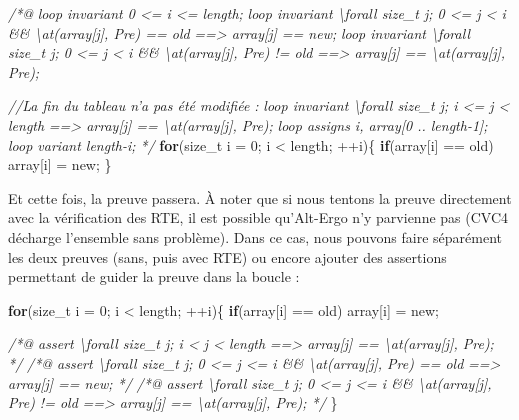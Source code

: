 \documentclass[12pt,francais,]{scrbook}
\newenvironment{Shaded}{}{}
\newcommand{\KeywordTok}[1]{\textcolor[rgb]{0.00,0.44,0.13}{\textbf{{#1}}}}
\newcommand{\DecValTok}[1]{\textcolor[rgb]{0.25,0.63,0.44}{{#1}}}
\newcommand{\CommentTok}[1]{\textcolor[rgb]{0.38,0.63,0.69}{\textit{{#1}}}}
\newcommand{\NormalTok}[1]{{#1}}
\begin{document}
\begin{footnotesize}\begin{Shaded}
\begin{Highlighting}[]
\CommentTok{/*@}
\CommentTok{  loop invariant 0 <= i <= length;}
\CommentTok{  loop invariant \textbackslash{}forall size_t j; 0 <= j < i && \textbackslash{}at(array[j], Pre) == old }
\CommentTok{                   ==> array[j] == new;}
\CommentTok{  loop invariant \textbackslash{}forall size_t j; 0 <= j < i && \textbackslash{}at(array[j], Pre) != old }
\CommentTok{                   ==> array[j] == \textbackslash{}at(array[j], Pre);}

\CommentTok{  //La fin du tableau n'a pas été modifiée :}
\CommentTok{  loop invariant \textbackslash{}forall size_t j; i <= j < length}
\CommentTok{                     ==> array[j] == \textbackslash{}at(array[j], Pre);}
\CommentTok{  loop assigns i, array[0 .. length-1];}
\CommentTok{  loop variant length-i;}
\CommentTok{*/}
\KeywordTok{for}\NormalTok{(size_t i = }\DecValTok{0}\NormalTok{; i < length; ++i)\{}
  \KeywordTok{if}\NormalTok{(array[i] == old) array[i] = new;}
\NormalTok{\}}
\end{Highlighting}
\end{Shaded}\end{footnotesize}

Et cette fois, la preuve passera. À noter que si nous tentons la preuve
directement avec la vérification des RTE, il est possible qu'Alt-Ergo
n'y parvienne pas (CVC4 décharge l'ensemble sans problème). Dans ce cas,
nous pouvons faire séparément les deux preuves (sans, puis avec RTE) ou
encore ajouter des assertions permettant de guider la preuve dans la
boucle :

\begin{footnotesize}\begin{Shaded}
\begin{Highlighting}[]
\KeywordTok{for}\NormalTok{(size_t i = }\DecValTok{0}\NormalTok{; i < length; ++i)\{}
  \KeywordTok{if}\NormalTok{(array[i] == old) array[i] = new;}

  \CommentTok{/*@ assert \textbackslash{}forall size_t j; i < j < length }
\CommentTok{               ==> array[j] == \textbackslash{}at(array[j], Pre);                      */}
  \CommentTok{/*@ assert \textbackslash{}forall size_t j; 0 <= j <= i && \textbackslash{}at(array[j], Pre) == old }
\CommentTok{               ==> array[j] == new;                                     */}
  \CommentTok{/*@ assert \textbackslash{}forall size_t j; 0 <= j <= i && \textbackslash{}at(array[j], Pre) != old }
\CommentTok{               ==> array[j] == \textbackslash{}at(array[j], Pre);                      */}    
\NormalTok{\}}
\end{Highlighting}
\end{Shaded}\end{footnotesize}
\end{document}
